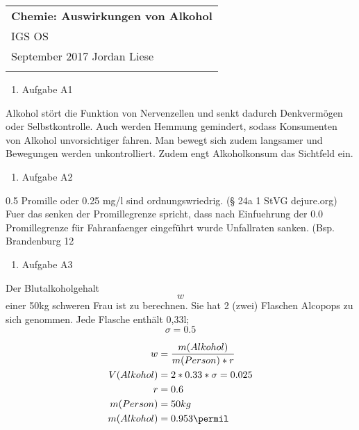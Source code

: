 \documentclass[a4paper, 12pt]{article}
\def \dtitle {Chemie: Auswirkungen von Alkohol}
\begin{document}
\thispagestyle{empty}

\begin{tabular}{p{15.5cm}}
{\large \bf \dtitle} \\
IGS OS\\ September 2017 \hspace*{10.5cm} Jordan Liese\\
\midrule
\\
\end{tabular}

\begin{enumerate}
    \item Aufgabe A1
\end{enumerate} 

Alkohol st\"ort die Funktion von Nervenzellen und senkt dadurch Denkverm\"ogen oder Selbstkontrolle.
Auch werden Hemmung gemindert, sodass Konsumenten von Alkohol unvorsichtiger fahren.
Man bewegt sich zudem langsamer und Bewegungen werden unkontrolliert. Zudem engt Alkoholkonsum das Sichtfeld ein.

\begin{enumerate}
    \item Aufgabe A2
\end{enumerate} 

0.5 Promille oder 0.25 mg/l sind ordnungswriedrig. (§ 24a 1 StVG dejure.org) 
Fuer das senken der Promillegrenze spricht, dass nach Einfuehrung der 0.0 Promillegrenze für Fahranfaenger
eingeführt wurde Unfallraten sanken. (Bsp. Brandenburg 12 %

\begin{enumerate}
    \item Aufgabe A3
\end{enumerate} 

Der Blutalkoholgehalt \[w\] einer 50kg schweren Frau ist zu berechnen. Sie hat 2 (zwei) Flaschen Alcopops zu sich genommen. Jede Flasche enthält 0,33l; \[ \sigma = 0.5\]

\begin{equation}
\begin{split}
w & = \frac{m(Alkohol)}{m(Person) * r}\\
V(Alkohol) & = 2 * 0.33 * \sigma = 0.025\\
r & = 0.6\\
m(Person) & = 50 kg\\
m(Alkohol) & = 0.953 \permil\\
\end{split}
\end{equation}
\end{document}

